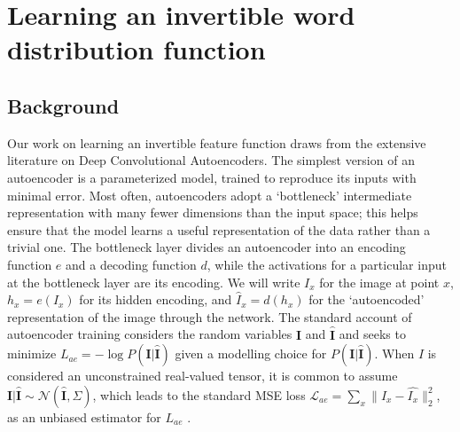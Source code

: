 \section{Learning an invertible word distribution function} \label{sec:learning-features}
\subsection{Background}
Our work on learning an invertible feature function draws from the extensive literature on Deep Convolutional Autoencoders. The simplest version of an autoencoder is a parameterized model, trained to reproduce its inputs with minimal error. Most often, autoencoders adopt a `bottleneck' intermediate representation with many fewer dimensions than the input space; this helps ensure that the model learns a useful representation of the data rather than a trivial one. The bottleneck layer divides an autoencoder into an encoding function $e$ and a decoding function $d$, while the activations for a particular input at the bottleneck layer are its encoding. We will write $I_x$ for the image at point $x$, $h_x = e(I_x)$ for its hidden encoding, and $\hat{I}_x = d(h_x)$ for the `autoencoded' representation of the image through the network. The standard account of autoencoder training considers the random variables $\mathbf{I}$ and $\mathbf{\hat{I}}$ and seeks to minimize $L_{ae} = -\log P(\mathbf{I} | \mathbf{\hat{I}})$ given a modelling choice for $P(\mathbf{I} | \mathbf{\hat{I}})$. When $I$ is considered an unconstrained real-valued tensor, it is common to assume $\mathbf{I}|\mathbf{\hat{I}} \sim \mathcal{N}(\mathbf{\hat{I}}, \Sigma)$, which leads to the standard MSE loss $\mathcal{L}_{ae} = \sum_x \| I_x - \hat{I_x}\|_2^2$, as an unbiased estimator for $L_{ae}$ \citep{vincent2010stacked}.

